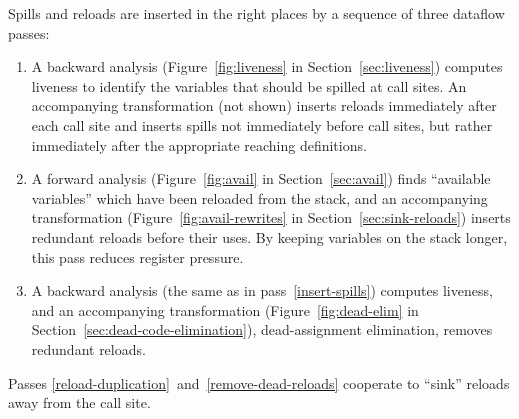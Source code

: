 \documentclass[blockstyle,preprint,natbib,nocopyrightspace]{sigplanconf}
\def\authornote#1{\unskip\relax}
\newcommand{\simon}[1]{\authornote{SLPJ: #1}}
\newcommand{\norman}[1]{\authornote{NR: #1}}
\let\remark\norman
\newcommand\secref[1]{Section~\ref{sec:#1}}
\newcommand\secreftwo[2]{Sections \ref{sec:#1}~and~\ref{sec:#2}}
\newcommand\figref[1]{Figure~\ref{fig:#1}}
\begin{document}
Spills and reloads are inserted 
\ifcutting\else in the right places \fi
by a sequence of 
\ifcutting\else three \fi
dataflow passes:
\remark{Uses of ``passes'' is not very consistent.
Would be nice to say ``pass = analysis + (possibly degenerate)
transformation.''}
\begin{enumerate}
\item
\label{insert-spills}
A backward analysis (\figref{liveness} in \secref{liveness}) computes liveness
to identify the variables that should be spilled at call sites.
An accompanying transformation (not shown) inserts reloads immediately
after each call 
site and inserts spills not immediately before call sites, but
rather immediately after the appropriate reaching definitions.
\item
\label{reload-duplication}
A forward analysis (\figref{avail} in \secref{avail}) finds
``available variables'' which have been reloaded 
from the stack, and an accompanying transformation
(\figref{avail-rewrites} in \secref{sink-reloads}) 
inserts redundant reloads before their uses.
By keeping variables on the stack longer, this pass reduces register pressure.
\item
\label{remove-dead-reloads}
A backward analysis (the same as in pass~\ref{insert-spills}) computes
liveness, 
and an accompanying transformation (\figref{dead-elim} in
\secref{dead-code-elimination}), dead-assignment elimination, 
removes redundant reloads.
\end{enumerate}
Passes
\ref{reload-duplication}~and~\ref{remove-dead-reloads} cooperate to ``sink''
reloads away from the call site.
\end{document}
